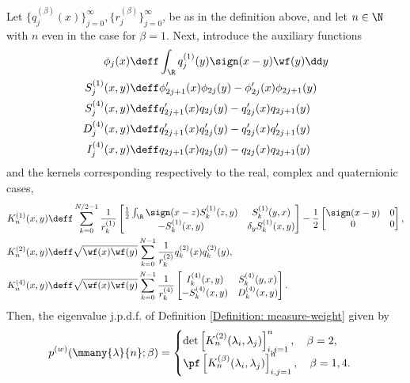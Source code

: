 \begin{thm}
	Let $\{q_j^{(\beta)}(x)\}_{j=0}^{\infty}, \{r_j^{(\beta)}\}_{j=0}^{\infty}$, be as in the definition above, and let $n \in \N$ with $n$ even in the case for $\beta = 1$. Next, introduce the auxiliary functions
	\begin{align}
		\phi_j(x) & \deff \int_{\R} q_j^{(1)}(y) \sign(x-y) \wf(y) \dd y \\
		S_j^{(1)}(x,y) & \deff \phi'_{2j+1}(x)\phi_{2j}(y) - \phi'_{2j}(x)\phi_{2j+1}(y) \\
		S_j^{(4)}(x,y) & \deff q'_{2j+1}(x)q_{2j}(y) - q'_{2j}(x)q_{2j+1}(y) \\
		D_j^{(4)}(x,y) & \deff q'_{2j+1}(x)q'_{2j}(y) - q'_{2j}(x)q'_{2j+1}(y) \\
		I_j^{(4)}(x,y) & \deff q_{2j+1}(x)q_{2j}(y) - q_{2j}(x)q_{2j+1}(y)
	\end{align}
	and the kernels corresponding respectively to the real, complex and quaternionic cases,
	\begin{align}
		K_n^{(1)}(x,y) & \deff \sum_{k=0}^{N/2-1} \frac{1}{r_k^{(1)}} \begin{bmatrix}
			\frac{1}{2} \int_{\R} \sign(x-z) S_k^{(1)}(z,y) & S_k^{(1)}(y,x) \\
			-S_k^{(1)}(x,y) & \delta_y S_k^{(1)}(x,y)
		\end{bmatrix} 
		- \frac{1}{2} 
		\begin{bmatrix}
			\sign(x-y) & 0 \\
			0 & 0
		\end{bmatrix},   \\
		K_n^{(2)}(x,y) & \deff \sqrt{\wf(x) \wf(y)} \sum_{k=0}^{N-1} \frac{1}{r_k^{(2)}} q_k^{(2)}(x) q_k^{(2)}(y), \\
		K_n^{(4)}(x,y) & \deff \sqrt{\wf(x) \wf(y)} \sum_{k=0}^{N-1} \frac{1}{r_k^{(4)}}
		\begin{bmatrix}
			I_k^{(4)}(x,y) & S_k^{(4)}(y,x) \\
			-S_k^{(4)}(x,y) & D_k^{(4)}(x,y)
		\end{bmatrix}.
	\end{align}
	Then, the eigenvalue j.p.d.f. of Definition \ref{Definition: measure-weight} given by
	\begin{equation}
		p^{(w)}(\mmany{\lambda}{n};\beta) = 
		\begin{cases}
			\det\left[ K_n^{(2)}(\lambda_i, \lambda_j) \right]_{i,j=1}^{n}, \quad \beta = 2, \\
			\pf\left[ K_n^{(\beta)}(\lambda_i, \lambda_j) \right]_{i,j=1}^{n}, \quad \beta = 1,4.
		\end{cases}
	\end{equation}
	\label{Theorem: Kernel}
\end{thm}

